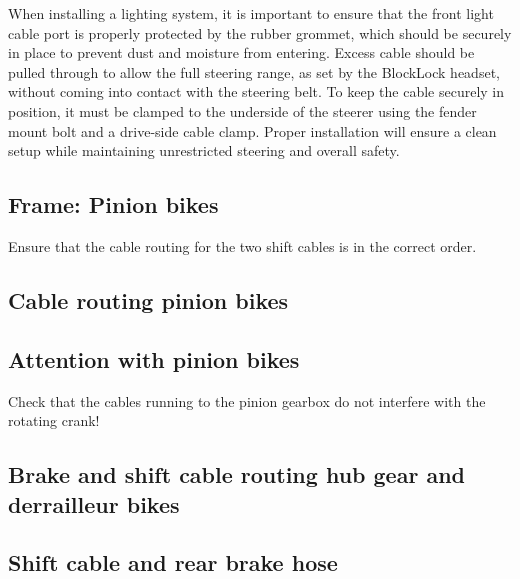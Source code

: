 \documentclass[12 pt]{article}
\newcommand{\bodyimage}[1]{\rightline{}}}
\begin{document}
When installing a lighting system, it is important to ensure that the
front light cable port is properly protected by the rubber grommet,
which should be securely in place to prevent dust and moisture from
entering. Excess cable should be pulled through to allow the full
steering range, as set by the BlockLock headset, without coming into
contact with the steering belt. To keep the cable securely in
position, it must be clamped to the underside of the steerer using the
fender mount bolt and a drive-side cable clamp. Proper installation
will ensure a clean setup while maintaining unrestricted steering and
overall safety.

\bodyimage{3_1_3_light_cable_routing.svg}

\subsection{Frame: Pinion bikes}

Ensure that the cable routing for the two shift cables is in the
correct order.

\bodyimage{3_2_1_brake_and_shift_cable_routing_pinion.svg}

\subsection{Cable routing pinion bikes}

\bodyimage{3_2_2_brake_and_shift_cable_routing.svg}

\subsection{Attention with pinion bikes}

Check that the cables running to the pinion gearbox do not interfere
with the rotating crank!

\bodyimage{3_2_5_brake_and_shift_cable_routing.svg}

\subsection{Brake and shift cable routing hub gear and derrailleur
  bikes}

\bodyimage{3_2_3_brake_and_shift_cable_routing.svg}

\subsection{Shift cable and rear brake hose}
\end{document}
